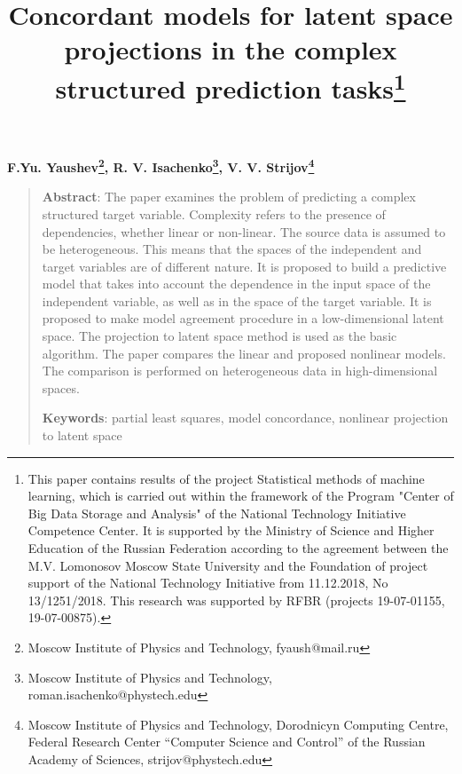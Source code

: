 \documentclass[12pt]{article}
\begin{document}
 
\title{Concordant models for latent space projections in the complex structured prediction tasks\thanks{This paper contains results of the project Statistical methods of machine learning, which is carried out within the framework of the Program "Center of Big Data Storage and Analysis" of the National Technology Initiative Competence Center. It is supported by the Ministry of Science and Higher Education of the Russian Federation according to the agreement between the M.V. Lomonosov Moscow State University and the Foundation of project support of the National Technology Initiative from 11.12.2018, No 13/1251/2018. This research was supported by RFBR (projects  19-07-01155, 19-07-00875).}}
\date{}
\maketitle

\begin{center}
\bf
F.Yu. Yaushev\footnote{Moscow Institute of Physics and Technology, fyaush@mail.ru},
R. V. Isachenko\footnote{Moscow Institute of Physics and Technology, roman.isachenko@phystech.edu},
V. V. Strijov\footnote{Moscow Institute of Physics and Technology, Dorodnicyn Computing Centre, Federal Research Center “Computer Science and Control” of the Russian Academy of Sciences, strijov@phystech.edu}
\end{center}

{\centering\begin{quote}
\textbf{Abstract}: 
The paper examines the problem of predicting a complex structured target variable. 
Complexity refers to the presence of dependencies, whether linear or non-linear. 
The source data is assumed to be heterogeneous.
This means that the spaces of the independent and target variables are of different nature. 
It is proposed to build a predictive model that takes into account the dependence in the input space of the independent variable, as well as in the space of the target variable. 
It is proposed to make model agreement procedure in a low-dimensional latent space. 
The projection to latent space method is used as the basic algorithm. 
The paper compares the linear and proposed nonlinear models. 
The comparison is performed on heterogeneous data in high-dimensional spaces.

	
\smallskip
\textbf{Keywords}: partial least squares, model concordance, nonlinear projection to latent space
\end{quote}
}
\end{document}
